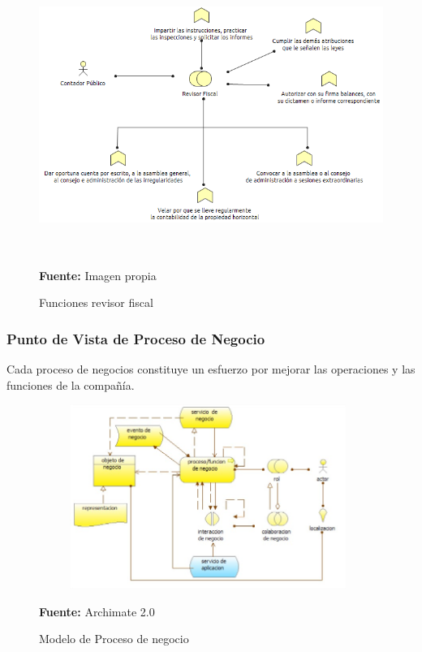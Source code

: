 \begin{figure}[th!]
	\centering
	\includegraphics[width=15cm,height=9cm]{arquitectura/negocio/imgs/funciones-3}
	\caption{Funciones revisor fiscal}{\scriptsize \textbf{Fuente:} Imagen propia}
\end{figure}

\newpage

\subsubsection{Punto de Vista de Proceso de Negocio}

Cada proceso de negocios constituye un esfuerzo por mejorar las operaciones y las funciones de la compañía. 


\begin{figure}[th!]
	\centering
	\includegraphics[width=11cm,height=6cm]{arquitectura/negocio/imgs/proceso-negocio}
	\caption{Modelo de Proceso de negocio}{\scriptsize \textbf{Fuente:} Archimate 2.0 \cite{WEB7}}
\end{figure}

